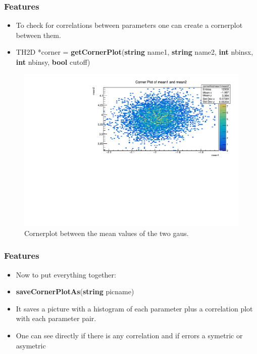 \documentclass{beamer}
\begin{document}
\begin{frame}
 \frametitle{Features}
 \begin{itemize}
  \item To check for correlations between parameters one can create a cornerplot between them.
  \item TH2D *corner = \textbf{getCornerPlot}(\textbf{string} name1, \textbf{string} name2, \textbf{int} nbinsx, \textbf{int} nbinsy, \textbf{bool} cutoff)
 \end{itemize}

 \begin{figure}
  \includegraphics[width=0.8\linewidth]{figures/corner_mean1_mean2}
  \caption{Cornerplot between the mean values of the two gaus.}
 \end{figure}

\end{frame}

\begin{frame}
 \frametitle{Features}
 \begin{itemize}
  \item Now to put everything together:
  \item \textbf{saveCornerPlotAs}(\textbf{string} picname)
  \item It saves a picture with a histogram of each parameter plus a correlation plot with each parameter pair.
  \item One can see directly if there is any correlation and if errors a symetric or asymetric
 \end{itemize}




\end{frame}

\end{document}

